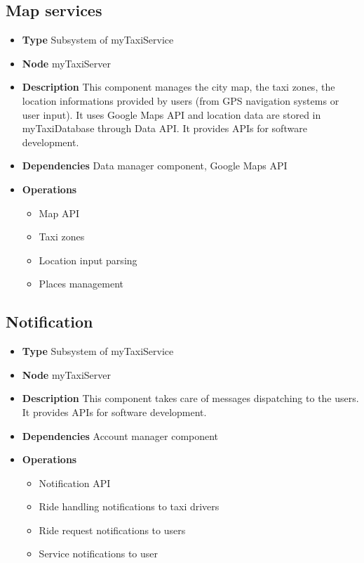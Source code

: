 \subsection{Map services}
\begin{itemize}
	\item[]\textbf{Type} Subsystem of myTaxiService
	\item[]\textbf{Node} myTaxiServer
	\item[]\textbf{Description} This component manages the city map, the taxi zones, the location informations provided by users (from GPS navigation systems or user input). It uses Google Maps API and location data are stored in myTaxiDatabase through Data API. It provides APIs for software development.
	\item[]\textbf{Dependencies} Data manager component, Google Maps API
	\item[]\textbf{Operations}\begin{itemize}
		\item Map API
		\item Taxi zones
		\item Location input parsing
		\item Places management
	\end{itemize}
\end{itemize}

\subsection{Notification}
\begin{itemize}
	\item[]\textbf{Type} Subsystem of myTaxiService
	\item[]\textbf{Node} myTaxiServer
	\item[]\textbf{Description}  This component takes care of messages dispatching to the users. It provides APIs for software development.
	\item[]\textbf{Dependencies} Account manager component
	\item[]\textbf{Operations}\begin{itemize}
		\item Notification API
		\item Ride handling notifications to taxi drivers
		\item Ride request notifications to users
		\item Service notifications to user
	\end{itemize}
\end{itemize}

